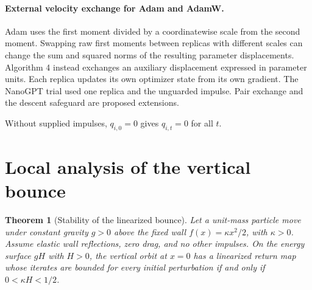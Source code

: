 \documentclass[10pt,letterpaper]{article}
\newtheorem{theorem}{Theorem}
\begin{document}
\paragraph{External velocity exchange for Adam and AdamW.}
Adam \cite{adam} uses the first moment divided by a coordinatewise scale from the second moment. Swapping raw first moments between replicas with different scales can change the sum and squared norms of the resulting parameter displacements. Algorithm 4 instead exchanges an auxiliary displacement expressed in parameter units. Each replica updates its own optimizer state from its own gradient. The NanoGPT trial used one replica and the unguarded impulse. Pair exchange and the descent safeguard are proposed extensions.

Without supplied impulses, \(q_{i,0}=0\) gives \(q_{i,t}=0\) for all \(t\).

\clearpage
\section{Local analysis of the vertical bounce}
\label{sec:analysis}

\begin{theorem}[Stability of the linearized bounce]\label{thm:bounce}
Let a unit-mass particle move under constant gravity \(g>0\) above the fixed wall \(f(x)=\kappa x^2/2\), with \(\kappa>0\). Assume elastic wall reflections, zero drag, and no other impulses. On the energy surface \(gH\) with \(H>0\), the vertical orbit at \(x=0\) has a linearized return map whose iterates are bounded for every initial perturbation if and only if \(0<\kappa H<1/2\).
\end{theorem}
\end{document}
